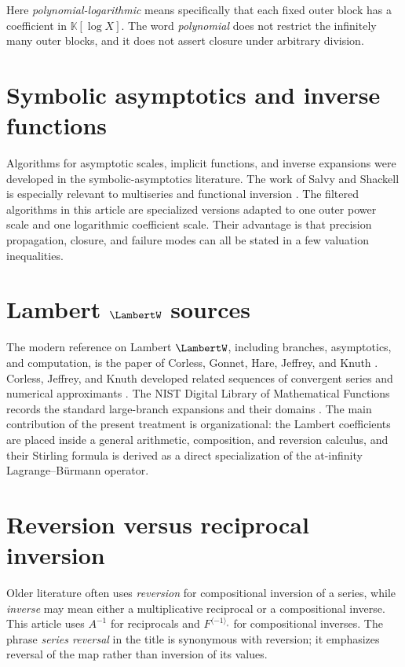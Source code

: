 \documentclass[11pt,oneside,openany]{book}
\newcommand{\K}{\mathbb{K}}
\newcommand{\rev}{^{\langle-1\rangle_{\circ}}}
\begin{document}
Here \emph{polynomial-logarithmic} means specifically that each fixed outer
block has a coefficient in \(\K[\log X]\).  The word \emph{polynomial} does
not restrict the infinitely many outer blocks, and it does not assert closure
under arbitrary division.

\section{Symbolic asymptotics and inverse functions}
Algorithms for asymptotic scales, implicit functions, and inverse expansions
were developed in the symbolic-asymptotics literature.  The work of Salvy and
Shackell is especially relevant to multiseries and functional inversion
\cite{SalvyShackell1992,SalvyShackell1998,SalvyShackell1999}.  The filtered
algorithms in this article are specialized versions adapted to one outer power
scale and one logarithmic coefficient scale.  Their advantage is that
precision propagation, closure, and failure modes can all be stated in a few
valuation inequalities.

\section{Lambert \texorpdfstring{\(\LambertW\)}{W} sources}
The modern reference on Lambert \(\LambertW\), including branches, asymptotics, and
computation, is the paper of Corless, Gonnet, Hare, Jeffrey, and Knuth
\cite{Corless1996}.  Corless, Jeffrey, and Knuth developed related sequences
of convergent series and numerical approximants \cite{JeffreyCorlessKnuth1997}.
The NIST Digital Library of Mathematical Functions records the standard
large-branch expansions and their domains \cite{DLMF}.  The main contribution
of the present treatment is organizational: the Lambert coefficients are
placed inside a general arithmetic, composition, and reversion calculus, and
their Stirling formula is derived as a direct specialization of the
at-infinity Lagrange--B\"urmann operator.

\section{Reversion versus reciprocal inversion}
Older literature often uses \emph{reversion} for compositional inversion of a
series, while \emph{inverse} may mean either a multiplicative reciprocal or a
compositional inverse.  This article uses \(A^{-1}\) for reciprocals and
\(F\rev\) for compositional inverses.  The phrase \emph{series reversal}
in the title is synonymous with reversion; it emphasizes reversal of the map
rather than inversion of its values.
\end{document}

